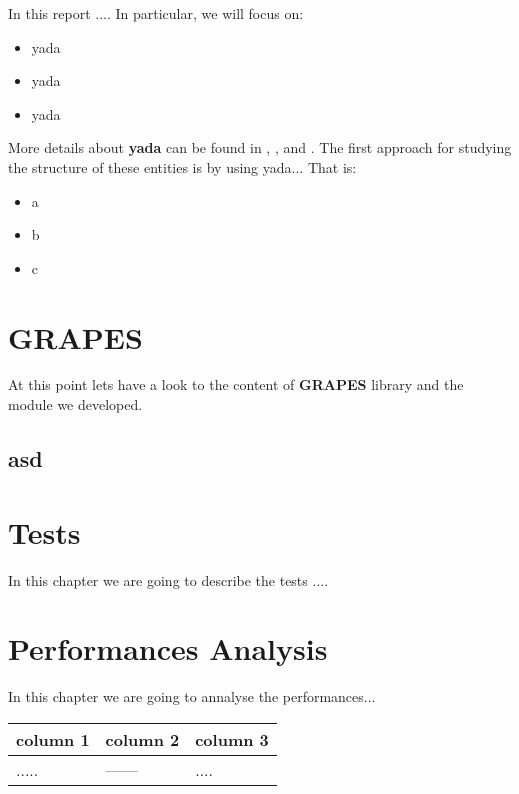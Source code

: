 \documentclass[12pt,a4paper]{report}
\begin{document}
In this report ....
In particular, we will focus on:
\begin{itemize}
  \item yada
  \item yada
  \item yada
\end{itemize}
More details about \textbf{yada} can be found in \cite{yada1}, \cite{yada2},
\cite{yada3} and \cite{yada4}.
The first approach for studying the structure of these entities is by using
yada...
That is:
\begin{itemize}
\item a
\item b
\item c
\end{itemize}


\chapter{GRAPES}
\label{ch:grapes}
At this point lets have a look to the content of \textbf{GRAPES} library and the module we developed.

\section{asd}
\label{asd}


\chapter{Tests}
\label{ch:tests}
In this chapter we are going to describe the tests ....


\chapter{Performances Analysis}
In this chapter we are going to annalyse the performances...

\begin{center}
    \begin{tabular}{ | p{4.8cm} | p{4.8cm} | p{4.8cm} |}
    \hline
       \textbf{column 1}
         & \textbf{column 2}
         & \textbf{column 3}\\ \hline \hline
       .....
         & ------
         & .... \\ \hline
     \end{tabular}
\end{center}
\end{document}
